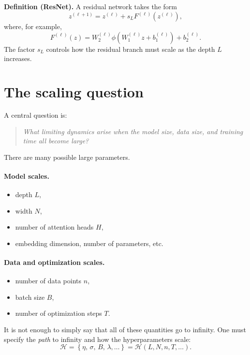 \textbf{Definition (ResNet).}
A residual network takes the form
\begin{equation}
    z^{(\ell+1)}
    =
    z^{(\ell)}
    +
    s_L F^{(\ell)}\!\left(z^{(\ell)}\right),
\end{equation}
where, for example,
\begin{equation}
    F^{(\ell)}(z)
    =
    W_2^{(\ell)}
    \phi\!\left(
        W_1^{(\ell)}z+b_1^{(\ell)}
    \right)
    +
    b_2^{(\ell)}.
\end{equation}
The factor \(s_L\) controls how the residual branch must scale as
the depth \(L\) increases.

\section{The scaling question}

A central question is:

\begin{quote}
\emph{What limiting dynamics arise when the model size, data size,
and training time all become large?}
\end{quote}

There are many possible large parameters.

\paragraph{Model scales.}
\begin{itemize}
    \item depth \(L\),
    \item width \(N\),
    \item number of attention heads \(H\),
    \item embedding dimension, number of parameters, etc.
\end{itemize}

\paragraph{Data and optimization scales.}
\begin{itemize}
    \item number of data points \(n\),
    \item batch size \(B\),
    \item number of optimization steps \(T\).
\end{itemize}

It is not enough to simply say that all of these quantities go to
infinity.  One must specify the \emph{path} to infinity and how the
hyperparameters scale:
\begin{equation}
    \mathcal{H}
    =
    \left\{
        \eta,\,
        \sigma,\,
        B,\,
        \lambda,\ldots
    \right\}
    =
    \mathcal{H}(L,N,n,T,\ldots).
\end{equation}


